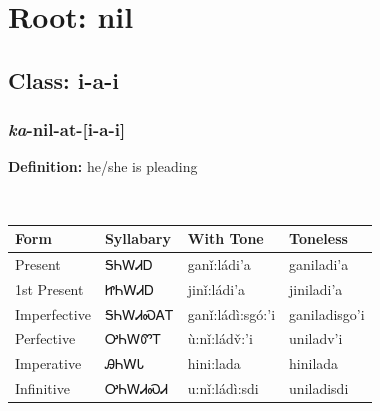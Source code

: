 \needspace{4in}
\section*{Root: nil}
\nopagebreak
{}
\needspace{3in}
\subsection*{Class: i-a-i}
\nopagebreak
\needspace{2in}
\subsubsection*{\textit{ka}{-}\textbf{nil}{-}at{-}[i-a-i]}
\nopagebreak
\textbf{Definition: } he/she is pleading
\\[0.5em]
\begin{tabularx}{\textwidth}{l X X X}%
\toprule%
\textbf{Form}&\textbf{Syllabary}&\textbf{With Tone}&\textbf{Toneless}\\%
\midrule%
Present&ᎦᏂᎳᏗᎠ&ganǐ:ládi’a&ganiladi’a\\%
1st Present&ᏥᏂᎳᏗᎠ&jinǐ:ládi’a&jiniladi’a\\%
Imperfective&ᎦᏂᎳᏗᏍᎪᎢ&ganǐ:ládì:sgó:’i&ganiladisgo’i\\%
Perfective&ᎤᏂᎳᏛᎢ&ù:nǐ:ládv̌:’i&uniladv’i\\%
Imperative&ᎯᏂᎳᏓ&hini:lada&hinilada\\%
Infinitive&ᎤᏂᎳᏗᏍᏗ&u:nǐ:ládì:sdi&uniladisdi\\%
\bottomrule%
\end{tabularx}
\\[1em]